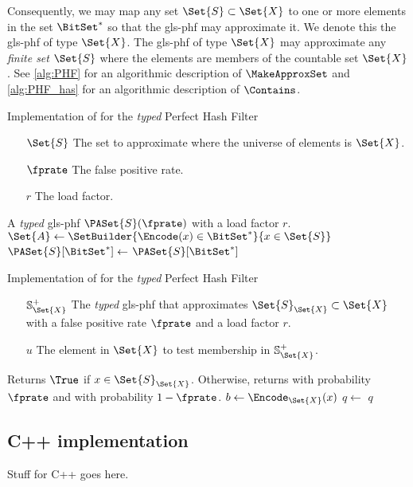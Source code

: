 \documentclass[ ../main.tex]{subfiles}
\begin{document}
Consequently, we may map any set $\Set{S} \subset \Set{X}$ to one or more elements in the set $\BitSet^*$ so that the \gls{gls-phf} may approximate it. We denote this the \gls{gls-phf} of type $\Set{X}$. The \gls{gls-phf} of type $\Set{X}$ may approximate any \emph{finite set} $\Set{S}$ where the elements are members of the countable set $\Set{X}$. See \cref{alg:PHF} for an algorithmic description of $\MakeApproxSet$ and \cref{alg:PHF_has} for an algorithmic description of $\Contains$.
\begin{algorithm}[h]
    \caption{Implementation of \protect\MakeApproxSet for the \emph{typed} Perfect Hash Filter}
    \label{alg:typedPHF}
    \KwIn
    {
        \begin{itemize}
            \item[$\Set{S}$] The set to approximate where the universe of elements is $\Set{X}$.
            \item[$\fprate$] The false positive rate.
            \item[$r$] The load factor.
        \end{itemize}
    }
    \KwOut
    {
        A \emph{typed} \gls{gls-phf} $\PASet{S}(\fprate)$ with a load factor $r$.
    }
    {
        $\Set{A} \gets \SetBuilder{ \Encode(x) \in \BitSet^*}{ x \in \Set{S} }$\;
        $\PASet{S}[\BitSet^{*}] \gets$ \;
        \Return $\PASet{S}[\BitSet^{*}]$\;
    }
\end{algorithm}
\begin{algorithm}[h]
    \caption{Implementation of \protect\Contains for the \emph{typed} Perfect Hash Filter}
    \label{alg:typed_PHF_contains}
    \KwIn
    {
        \begin{itemize}
            \item[$\Sp_{\Set{X}}$] The \emph{typed} \gls{gls-phf} that approximates $\Set{S}_{\Set{X}} \subset \Set{X}$ with a false positive rate $\fprate$ and a load factor $r$.
            \item[$u$] The element in $\Set{X}$ to test membership in $\Sp_{\Set{X}}$.
        \end{itemize}
    }
    \KwOut
    {
        Returns $\True$ if $x \in \Set{S}_{\Set{X}}$. Otherwise, returns \True with probability $\fprate$ and \False with probability $1 - \fprate$.
    }
    {
        $b \gets \Encode_\Set{X}(x)$\;
        $q \gets$ \;
        \Return $q$\;
    }
\end{algorithm}

\subsection{C++ implementation}
Stuff for C++ goes here.
\end{document}
